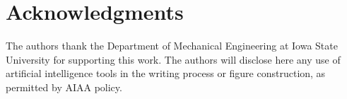 \section*{Acknowledgments}
The authors thank the Department of Mechanical Engineering at Iowa State University for supporting this work. The authors will disclose here any use of artificial intelligence tools in the writing process or figure construction, as permitted by AIAA policy.
